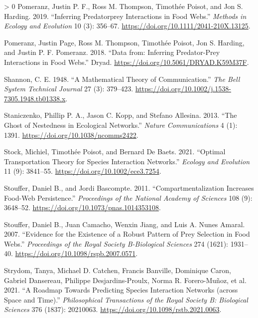 \documentclass[11pt]{article}
\newlength{\cslhangindent}
\newenvironment{CSLReferences}[3] %
 {%
  \setlength{\parindent}{0pt}
  \ifodd #1 \everypar{\setlength{\hangindent}{\cslhangindent}}\ignorespaces\fi
  \ifnum #2 > 0
  \setlength{\parskip}{#2\baselineskip}
  \fi
 }%
 {}
\begin{document}
\begin{CSLReferences}{1}{0}
\leavevmode\hypertarget{ref-Pomeranz2019InfPrea}{}%
Pomeranz, Justin P. F., Ross M. Thompson, Timothée Poisot, and Jon S.
Harding. 2019. {``Inferring Predatorprey Interactions in Food Webs.''}
\emph{Methods in Ecology and Evolution} 10 (3): 356--67.
\url{https://doi.org/10.1111/2041-210X.13125}.

\leavevmode\hypertarget{ref-Pomeranz2018DatInf}{}%
Pomeranz, Justin Page, Ross M. Thompson, Timothée Poisot, Jon S.
Harding, and Justin P. F. Pomeranz. 2018. {``Data from: Inferring
Predator-Prey Interactions in Food Webs.''} Dryad.
\url{https://doi.org/10.5061/DRYAD.K59M37F}.

\leavevmode\hypertarget{ref-Shannon1948MatThe}{}%
Shannon, C. E. 1948. {``A Mathematical Theory of Communication.''}
\emph{The Bell System Technical Journal} 27 (3): 379--423.
\url{https://doi.org/10.1002/j.1538-7305.1948.tb01338.x}.

\leavevmode\hypertarget{ref-Staniczenko2013GhoNes}{}%
Staniczenko, Phillip P. A., Jason C. Kopp, and Stefano Allesina. 2013.
{``The Ghost of Nestedness in Ecological Networks.''} \emph{Nature
Communications} 4 (1): 1391. \url{https://doi.org/10.1038/ncomms2422}.

\leavevmode\hypertarget{ref-Stock2021OptTra}{}%
Stock, Michiel, Timothée Poisot, and Bernard De Baets. 2021. {``Optimal
Transportation Theory for Species Interaction Networks.''} \emph{Ecology
and Evolution} 11 (9): 3841--55.
\url{https://doi.org/10.1002/ece3.7254}.

\leavevmode\hypertarget{ref-Stouffer2011ComInc}{}%
Stouffer, Daniel B., and Jordi Bascompte. 2011. {``Compartmentalization
Increases Food-Web Persistence.''} \emph{Proceedings of the National
Academy of Sciences} 108 (9): 3648--52.
\url{https://doi.org/10.1073/pnas.1014353108}.

\leavevmode\hypertarget{ref-Stouffer2007EviExi}{}%
Stouffer, Daniel B., Juan Camacho, Wenxin Jiang, and Luis A. Nunes
Amaral. 2007. {``Evidence for the Existence of a Robust Pattern of Prey
Selection in Food Webs.''} \emph{Proceedings of the Royal Society
B-Biological Sciences} 274 (1621): 1931--40.
\url{https://doi.org/10.1098/rspb.2007.0571}.

\leavevmode\hypertarget{ref-Strydom2021RoaPre}{}%
Strydom, Tanya, Michael D. Catchen, Francis Banville, Dominique Caron,
Gabriel Dansereau, Philippe Desjardins-Proulx, Norma R. Forero-Muñoz, et
al. 2021. {``A Roadmap Towards Predicting Species Interaction Networks
(across Space and Time).''} \emph{Philosophical Transactions of the
Royal Society B: Biological Sciences} 376 (1837): 20210063.
\url{https://doi.org/10.1098/rstb.2021.0063}.


\end{CSLReferences}
\end{document}

